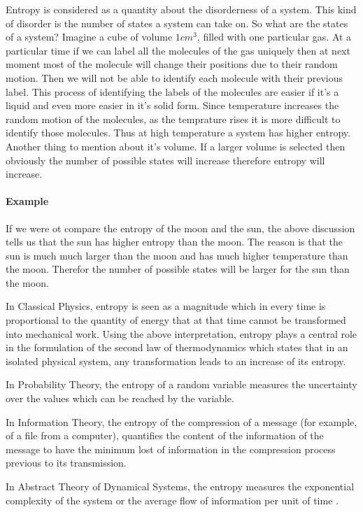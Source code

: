 	
	
	Entropy is considered as a quantity about the disorderness of a system. This kind of disorder is the number of states a system can take on. So what are the states of a system? Imagine a cube of volume $1cm^3$, filled with one particular gas. At a particular time if we can label all the molecules of the gas uniquely then at next moment most of the molecule will change their positions due to their random motion. Then we will not be able to identify each molecule with their previous label. This process of identifying the labels of the molecules are easier if it's a liquid and even more easier in it's solid form. Since temperature increases the random motion of the molecules, as the temprature rises it is more difficult to identify those molecules. Thus at high temperature a system has higher entropy. Another thing to mention about it's volume. If a larger volume is selected then obviously the number of possible states will increase therefore entropy will increase.
	
	
	\paragraph{Example}
	If we were ot compare the entropy of the moon and the sun, the above discussion tells us that the sun has higher entropy than the moon. The reason is that the sun is much much larger than the moon and has much higher temperature than the moon. Therefor the number of possible states will be larger for the sun than the moon.
	
	
	In Classical Physics, entropy is seen as a magnitude which in every time is proportional to	the quantity of energy that at that time cannot be transformed into mechanical work. Using the	above interpretation, entropy plays a central role in the formulation of the second law of thermodynamics which states that in an isolated physical system, any transformation leads to an increase	of its entropy. 
	
	In Probability Theory, the entropy of a random variable measures the uncertainty over the	values which can be reached by the variable.
	
	In Information Theory, the entropy of the compression of a message (for example, of a file	from a computer), quantifies the content of the information of the message to have the minimum	lost of information in the compression process previous to its transmission.
	
	In Abstract Theory of Dynamical Systems, the entropy measures the exponential complexity	of the system or the average flow of information per unit of time \cite{Balibrea2016}.
	
